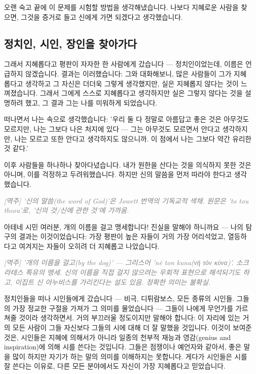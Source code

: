 \documentclass[11pt, a4paper]{article}
\newcommand{\tnote}[1]{\par\noindent\textit{\textcolor{gray}{[역주] #1}}\par\smallskip}
\begin{document}
오랜 숙고 끝에 이 문제를 시험할 방법을 생각해냈습니다. 나보다 지혜로운 사람을 찾으면, 그것을 증거로 들고 신에게 가면 되겠다고 생각했습니다.


\bigskip


\subsection{정치인, 시인, 장인을 찾아가다}


그래서 지혜롭다고 평판이 자자한 한 사람에게 갔습니다 — 정치인이었는데, 이름은 언급하지 않겠습니다. 결과는 이러했습니다: 그와 대화해보니, 많은 사람들이 그가 지혜롭다고 생각하고 그 자신은 더더욱 그렇게 생각했지만, 실은 지혜롭지 않다는 것이 느껴졌습니다. 그래서 그에게 스스로 지혜롭다고 생각하지만 실은 그렇지 않다는 것을 설명하려 했고, 그 결과 그는 나를 미워하게 되었습니다.


떠나면서 나는 속으로 생각했습니다: '우리 둘 다 정말로 아름답고 좋은 것은 아무것도 모르지만, 나는 그보다 나은 처지에 있다 — 그는 아무것도 모르면서 안다고 생각하지만, 나는 모르고 또한 안다고 생각하지도 않으니까. 이 점에서 나는 그보다 약간 유리한 것 같다.'


이후 사람들을 하나하나 찾아다녔습니다. 내가 원한을 산다는 것을 의식하지 못한 것은 아니며, 이를 걱정하고 두려워했습니다. 하지만 신의 말씀을 먼저 따라야 한다고 생각했습니다.


\tnote{'신의 말씀(the word of God)'은 Jowett 번역의 기독교적 색채. 원문은 'to tou theou'로, '신의 것/신에 관한 것'에 가까움.}


아테네 시민 여러분, 개의 이름을 걸고 맹세합니다! 진실을 말해야 하니까요 — 나의 탐구의 결과는 이것이었습니다: 가장 평판이 높은 자들이 거의 가장 어리석었고, 열등하다고 여겨지는 자들이 오히려 더 지혜롭고 나았습니다.


\tnote{'개의 이름을 걸고(by the dog)' — 그리스어 'nē ton kuna(νὴ τὸν κύνα)'. 소크라테스 특유의 맹세. 신의 이름을 직접 걸지 않으려는 우회적 표현으로 해석되기도 하고, 이집트 신 아누비스를 가리킨다는 설도 있음. 정확한 의미는 불확실.}


정치인들을 떠나 시인들에게 갔습니다 — 비극, 디튀람보스, 모든 종류의 시인들. 그들의 가장 정교한 구절을 가져가 그 의미를 물었습니다 — 그들이 나에게 무언가를 가르쳐줄 것이라 생각하면서. 거의 부끄러울 정도이지만 말해야 합니다: 이 자리에 있는 거의 모든 사람이 그들 자신보다 그들의 시에 대해 더 잘 말했을 것입니다. 이것이 보여준 것은, 시인들은 지혜에 의해서가 아니라 일종의 천부적 재능과 영감(genius and inspiration)에 의해 시를 쓴다는 것입니다. 그들은 점쟁이나 예언자와 같아서, 좋은 말을 많이 하지만 자기가 하는 말의 의미를 이해하지는 못합니다. 게다가 시인들은 시를 잘 쓴다는 이유로, 다른 모든 분야에서도 자신이 가장 지혜롭다고 믿었습니다.
\end{document}

